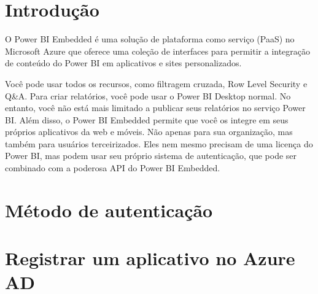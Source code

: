 \documentclass[
	12pt,				%
	openright,			%
	twoside,			%
	a4paper,			%
	english,			%
	french,				%
	spanish,			%
	brazil,				%
	]{abntex2}
\begin{document}
	
	
	\frenchspacing 
	
	
	\imprimircapa
	
	\imprimirfolhaderosto*
	
	\textual
	
	\tableofcontents*
	\cleardoublepage
	
	\chapter*[Introdução]{Introdução}
	
O Power BI Embedded é uma solução de plataforma como serviço (PaaS) no Microsoft Azure que oferece uma coleção de interfaces para permitir a integração de conteúdo do Power BI em aplicativos e sites personalizados.

Você pode usar todos os recursos, como filtragem cruzada, Row Level Security e Q\&A. Para criar relatórios, você pode usar o Power BI Desktop normal. No entanto, você não está mais limitado a publicar seus relatórios no serviço Power BI. Além disso, o Power BI Embedded permite que você os integre em seus próprios aplicativos da web e móveis. Não apenas para sua organização, mas também para usuários terceirizados. Eles nem mesmo precisam de uma licença do Power BI, mas podem usar seu próprio sistema de autenticação, que pode ser combinado com a poderosa API do Power BI Embedded.

	\chapter{Método de autenticação}
	\chapter{Registrar um aplicativo no Azure AD}
\end{document}
